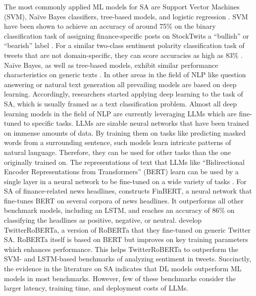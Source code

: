 The most commonly applied ML models for SA are Support Vector Machines (SVM), Na\"ive Bayes classifiers, tree-based models, and logistic regression . SVM have been shown to achieve an accuracy of around 75\% on the binary classification task of assigning finance-specific posts on StockTwits a ``bullish'' or ``bearish'' label \cite{renault2020sentiment}. For a similar two-class sentiment polarity classification task of tweets that are not domain-specific, they can score accuracies as high as 83\% . Na\"ive Bayes, as well as tree-based models, exhibit similar performance characteristics on generic texts . 
In other areas in the field of NLP like question answering or natural text generation all prevailing models are based on deep learning. Accordingly, researchers started applying deep learning to the task of SA, which is usually framed as a text classification problem. 
Almost all deep learning models in the field of NLP are currently leveraging LLMs which are fine-tuned to specific tasks. LLMs are sizable neural networks that have been trained on immense amounts of data. By training them on tasks like predicting masked words from a surrounding sentence, such models learn intricate patterns of natural language. Therefore, they can be used for other tasks than the one originally trained on. The representations of text that LLMs like ``Bidirectional Encoder Representations from Transformers'' (BERT) learn can be used by a single layer in a neural network to be fine-tuned on a wide variety of tasks . For SA of finance-related news headlines,  constructs FinBERT, a neural network that fine-tunes BERT on several corpora of news headlines. It outperforms all other benchmark models, including an LSTM, and reaches an accuracy of 86\% on classifying the headlines as positive, negative, or neutral.  develop TwitterRoBERTa, a version of RoBERTa  that they fine-tuned on generic Twitter SA. RoBERTa itself is based on BERT but improves on key training parameters which enhances performance. This helps TwitterRoBERTa to outperform the SVM- and LSTM-based benchmarks of analyzing sentiment in tweets. Succinctly, the evidence in the literature on SA indicates that DL models outperform ML models in most benchmarks. However, few of these benchmarks consider the larger latency, training time, and deployment costs of LLMs.


